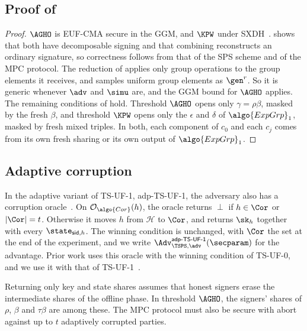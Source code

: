 \subsection{Proof of }\label{sec:tsps-proof-instantiation}

\begin{proof}

  $\AGHO$ is EUF-CMA secure in the GGM, and $\KPW$ under
SXDH~\cite{C:AGHO11,C:KilPanWee15}.  shows that
both have decomposable signing and that combining reconstructs an ordinary
signature, so correctness follows from that of the SPS scheme and of the MPC
protocol. The reduction of  applies only
group operations to the group elements it receives, and samples uniform group
elements as $\gen^r$. So it is generic whenever $\adv$ and $\simu$ are, and the
GGM bound for $\AGHO$ applies. The remaining conditions of
 hold. Threshold $\AGHO$ opens only
$\gamma = \rho\beta$, masked by the fresh $\beta$, and threshold $\KPW$ opens
only the $\epsilon$ and $\delta$ of $\algo{ExpGrp}_1$, masked by fresh mixed
triples. In both, each component of $c_0$ and each $c_j$ comes from its own
fresh sharing or its own output of $\algo{ExpGrp}_1$.

\end{proof}

\subsection{Adaptive corruption}\label{sec:tsps-adaptive}

In the adaptive variant of TS-UF-1, adp-TS-UF-1, the adversary also has a
corruption oracle~\cite{C:CriKomMal23}. On $\mathcal{O}_{\algo{Cor}}(h)$, the
oracle returns $\perp$ if $h \in \Cor$ or $|\Cor| = t$. Otherwise it moves $h$
from $\mathcal{H}$ to $\Cor$, and returns $\sk_h$ together with every
$\state_{\mathsf{sid},h}$. The winning condition is unchanged, with $\Cor$ the
set at the end of the experiment, and we write
$\Adv_{\TSPS, \adv}^{\mathsf{adp\text{-}TS\text{-}UF\text{-}1}}(\secparam)$
for the advantage. Prior work uses this oracle with the winning condition of
TS-UF-0, and we use it with that of TS-UF-1~\cite{C:CriKomMal23}.

Returning only key and state shares assumes that honest signers erase the
intermediate shares of the offline phase. In threshold $\AGHO$, the signers'
shares of $\rho$, $\beta$ and $\tau\beta$ are among these. The MPC protocol must
also be secure with abort against up to $t$ adaptively corrupted parties.

